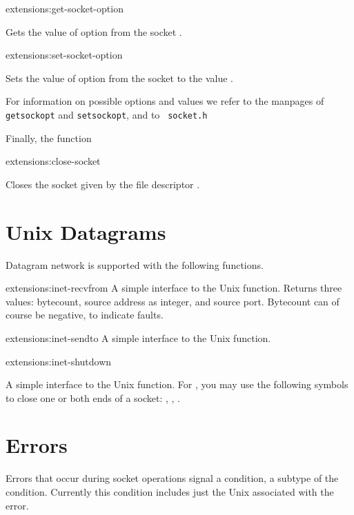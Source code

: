 \begin{defun}{extensions:}{get-socket-option}{%
    }
  
  Gets the value of option  from the socket .

\end{defun}

\begin{defun}{extensions:}{set-socket-option}{%
    }
  
  Sets the value of option  from the socket 
  to the value .

\end{defun}

For information on possible options and values we refer to the
manpages of {\tt getsockopt} and {\tt setsockopt}, and to {\tt
 socket.h}

Finally, the function

\begin{defun}{extensions:}{close-socket}{%
    }

  Closes the socket given by the file descriptor .

\end{defun}

\section{Unix Datagrams}

Datagram network is supported with the following functions.

\begin{defun}{extensions:}{inet-recvfrom}{%
	}
   A simple interface to the Unix  function. Returns
   three values: bytecount, source address as integer, and source
   port. Bytecount can of course be negative, to indicate faults.
\end{defun}

\begin{defun}{extensions:}{inet-sendto}{%
	}
   A simple interface to the Unix  function.
\end{defun}

\begin{defun}{extensions:}{inet-shutdown}{%
	}

   A simple interface to the Unix  function.  For
   , you may use the following symbols to close one or
   both ends of a socket: , ,
   .

\end{defun}

\section{Errors}

Errors that occur during socket operations signal a
 condition, a subtype of the 
condition.  Currently this condition includes just the Unix
 associated with the error.
